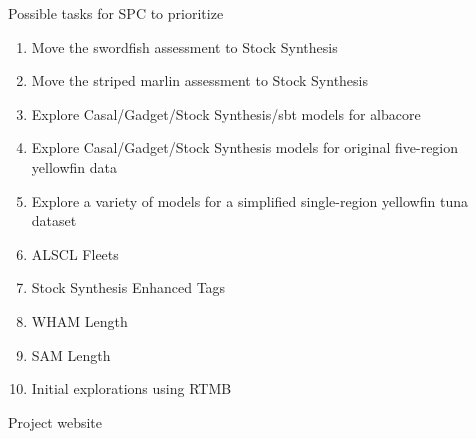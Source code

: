\documentclass[aspectratio=169,fleqn]{beamer}
\begin{document}

\begin{frame}{Possible tasks for SPC to prioritize}
  \begin{enumerate}
    \item Move the {\darkgreen swordfish} assessment to Stock Synthesis\\[1ex]
    \item Move the {\darkgreen striped marlin} assessment to Stock
    Synthesis\\[1ex]
    \item Explore Casal/Gadget/Stock Synthesis/sbt models for {\darkgreen
      albacore}\\[1ex]
    \item Explore Casal/Gadget/Stock Synthesis models for original {\darkgreen
      five-region yellowfin} data\\[1ex]
    \item Explore a variety of models for a simplified {\darkgreen single-region
      yellowfin} tuna dataset\\[1ex]
    \item ALSCL$\,$\raisebox{0.15ex}{+}$\,$Fleets\\[1ex]
    \item Stock Synthesis$\,$\raisebox{0.15ex}{+}$\,$Enhanced Tags\\[1ex]
    \item WHAM$\,$\raisebox{0.15ex}{+}$\,$Length\\[1ex]
    \item SAM$\,$\raisebox{0.15ex}{+}$\,$Length\\[1ex]
    \item Initial explorations using {\darkgreen RTMB}\\[1ex]
  \end{enumerate}
\end{frame}


\begin{frame}{Project website}
  \centering\small
\end{frame}
\end{document}
